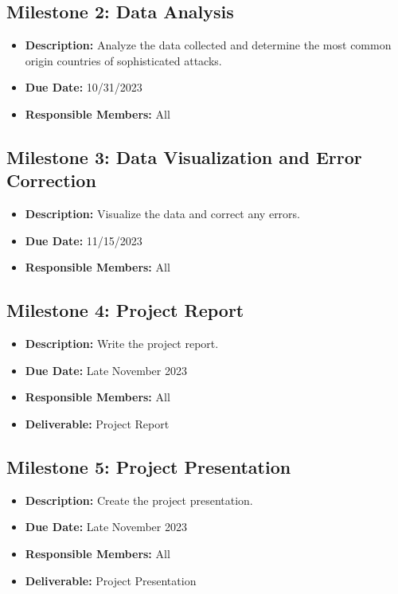 \documentclass[letterpaper, 10 pt, conference]{ieeeconf}  %
\begin{document}
    \subsection*{Milestone 2: Data Analysis}
    \begin{itemize}
        \item \textbf{Description:} Analyze the data collected and determine the most common origin countries of sophisticated attacks.
        \item \textbf{Due Date:} 10/31/2023
        \item \textbf{Responsible Members:} All
    \end{itemize}
    \subsection*{Milestone 3: Data Visualization and Error Correction}
    \begin{itemize}
        \item \textbf{Description:} Visualize the data and correct any errors.
        \item \textbf{Due Date:} 11/15/2023
        \item \textbf{Responsible Members:} All
    \end{itemize}
    \subsection*{Milestone 4: Project Report}
    \begin{itemize}
        \item \textbf{Description:} Write the project report.
        \item \textbf{Due Date:} Late November 2023
        \item \textbf{Responsible Members:} All
        \item \textbf{Deliverable:} Project Report
    \end{itemize}
    \subsection*{Milestone 5: Project Presentation}
    \begin{itemize}
        \item \textbf{Description:} Create the project presentation.
        \item \textbf{Due Date:} Late November 2023
        \item \textbf{Responsible Members:} All
        \item \textbf{Deliverable:} Project Presentation
    \end{itemize}
\end{document}
